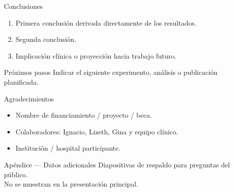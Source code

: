 \documentclass[aspectratio=169, 11pt]{beamer}
\begin{document}
\begin{frame}{Conclusiones}
  \begin{enumerate}
    \item Primera conclusión derivada directamente de los resultados.
    \item Segunda conclusión.
    \item Implicación clínica o proyección hacia trabajo futuro.
  \end{enumerate}

  \vspace{1em}
  \begin{alertblock}{Próximos pasos}
    Indicar el siguiente experimento, análisis o publicación planificada.
  \end{alertblock}
\end{frame}

\begin{frame}{Agradecimientos}
  \begin{itemize}
    \item Nombre de financiamiento / proyecto / beca.
    \item Colaboradores: Ignacio, Lizeth, Gina y equipo clínico.
    \item Institución / hospital participante.
  \end{itemize}
\end{frame}


\appendix

\begin{frame}{Apéndice — Datos adicionales}
  Diapositivas de respaldo para preguntas del público.\\
  No se muestran en la presentación principal.
\end{frame}
\end{document}
